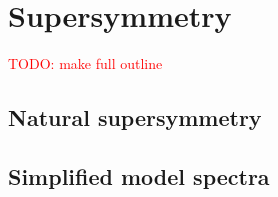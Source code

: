 \chapter{Supersymmetry \label{chap:supersymmetry}}


\textcolor{red}{TODO: make full outline}

\section{Natural supersymmetry \label{sec:susy_natural_susy}}



\section{Simplified model spectra \label{sec:susy_sms}}

